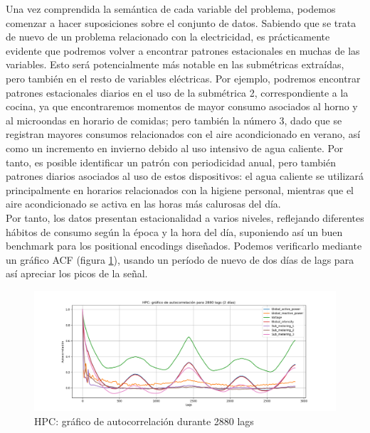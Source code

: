 Una vez comprendida la semántica de cada variable del problema, podemos comenzar a hacer suposiciones sobre el conjunto de datos. Sabiendo que se trata de nuevo de un problema relacionado con la electricidad, es prácticamente evidente que podremos volver a encontrar patrones estacionales en muchas de las variables. Esto será potencialmente más notable en las submétricas extraídas, pero también en el resto de variables eléctricas. Por ejemplo, podremos encontrar patrones estacionales diarios en el uso de la submétrica 2, correspondiente a la cocina, ya que encontraremos momentos de mayor consumo asociados al horno y al microondas en horario de comidas; pero también la número 3, dado que se registran mayores consumos relacionados con el aire acondicionado en verano, así como un incremento en invierno debido al uso intensivo de agua caliente. Por tanto, es posible identificar un patrón con periodicidad anual, pero también patrones diarios asociados al uso de estos dispositivos: el agua caliente se utilizará principalmente en horarios relacionados con la higiene personal, mientras que el aire acondicionado se activa en las horas más calurosas del día.\\

Por tanto, los datos presentan estacionalidad a varios niveles, reflejando diferentes hábitos de consumo según la época y la hora del día, suponiendo así un buen benchmark para los positional encodings diseñados. Podemos verificarlo mediante un gráfico ACF (figura \ref{autohpc}), usando un período de nuevo de dos días de lags para así apreciar los picos de la señal.\\

\begin{figure}[!ht]
	\centering
	\includegraphics[scale=0.4]{img/hpc_autocorrelacion}
	\caption{HPC: gráfico de autocorrelación durante 2880 lags}
	\label{autohpc}
\end{figure}

